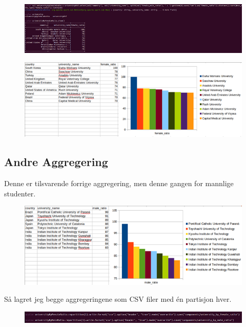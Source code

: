 \FigureCounter
\begin{figure}[H]
    \includegraphics[width=\textwidth]{images/milepael5/uniFemaleRatio.png}
\end{figure}
\FigureCounter
\begin{figure}[H]
    \includegraphics[width=\textwidth]{images/milepael5/resUniFemRatio.png}
\end{figure}

\subsection{Andre Aggregering}
Denne er tilsvarende forrige aggregering, men denne gangen for mannlige studenter.

\FigureCounter
\begin{figure}[H]
    \includegraphics[width=\textwidth]{images/milepael5/resUniMaleRatio.png}
\end{figure}

Så lagret jeg begge aggregeringene som CSV filer med én partisjon hver.

\FigureCounter
\begin{figure}[H]
    \includegraphics[width=\textwidth]{images/milepael5/writeToFile.png}
\end{figure}

